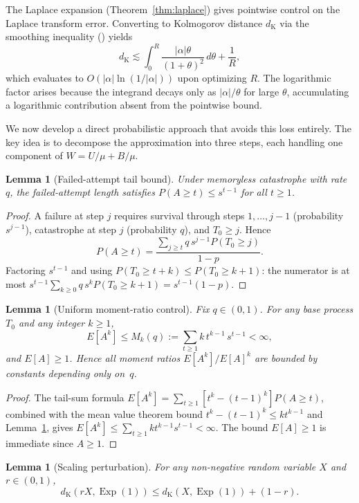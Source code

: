 \documentclass[11pt]{article}
\theoremstyle{plain}
\newtheorem{lemma}[theorem]{Lemma}
\theoremstyle{definition}
\theoremstyle{remark}
\DeclareMathOperator{\Exp}{Exp}
\newcommand{\dK}{d_{\mathrm{K}}}
\begin{document}
The Laplace expansion (Theorem~\ref{thm:laplace}) gives pointwise control on the Laplace transform error.  Converting to Kolmogorov distance $\dK$ via the smoothing inequality (\cite{Kalashnikov97}) yields
\[
  \dK \lesssim \int_0^R \frac{|\alpha|\theta}{(1+\theta)^2}\,d\theta + \frac{1}{R},
\]
which evaluates to $O(|\alpha|\ln(1/|\alpha|))$ upon optimizing $R$.  The logarithmic factor arises because the integrand decays only as $|\alpha|/\theta$ for large $\theta$, accumulating a logarithmic contribution absent from the pointwise bound.

We now develop a direct probabilistic approach that avoids this loss entirely.  The key idea is to decompose the approximation into three steps, each handling one component of $W = U/\mu + B/\mu$.

\begin{lemma}[Failed-attempt tail bound]\label{lem:tail}
Under memoryless catastrophe with rate $q$, the failed-attempt length satisfies $P(A \geq t) \leq s^{t-1}$ for all $t \geq 1$.
\end{lemma}

\begin{proof}
A failure at step $j$ requires survival through steps $1, \ldots, j-1$ (probability $s^{j-1}$), catastrophe at step $j$ (probability $q$), and $T_0 \geq j$.  Hence
\[
  P(A \geq t) = \frac{\sum_{j \geq t} q\,s^{j-1} P(T_0 \geq j)}{1-p}.
\]
Factoring $s^{t-1}$ and using $P(T_0 \geq t+k) \leq P(T_0 \geq k+1)$: the numerator is at most $s^{t-1}\sum_{k \geq 0} q\,s^k P(T_0 \geq k+1) = s^{t-1}(1-p)$.
\end{proof}

\begin{lemma}[Uniform moment-ratio control]\label{lem:moment-ratio}
Fix $q \in (0,1)$.  For any base process $T_0$ and any integer $k \geq 1$,
\[
  E[A^k] \leq M_k(q) := \sum_{t \geq 1} k\,t^{k-1}\,s^{t-1} < \infty,
\]
and $E[A] \geq 1$.  Hence all moment ratios $E[A^k]/E[A]^k$ are bounded by constants depending only on~$q$.
\end{lemma}

\begin{proof}
The tail-sum formula $E[A^k] = \sum_{t \geq 1}[t^k - (t-1)^k]P(A \geq t)$, combined with the mean value theorem bound $t^k - (t-1)^k \leq kt^{k-1}$ and Lemma~\ref{lem:tail}, gives $E[A^k] \leq \sum_{t \geq 1} kt^{k-1}s^{t-1} < \infty$.  The bound $E[A] \geq 1$ is immediate since $A \geq 1$.
\end{proof}

\begin{lemma}[Scaling perturbation]\label{lem:scaling}
For any non-negative random variable $X$ and $r \in (0,1)$,
\[
  \dK(rX, \Exp(1)) \leq \dK(X, \Exp(1)) + (1-r).
\]
\end{lemma}
\end{document}
